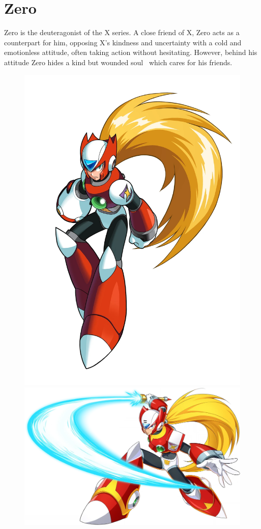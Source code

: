 \chapter{Zero}\label{char:Zero}
Zero is the deuteragonist of the X series. A close friend of X, Zero acts as a counterpart for him, opposing X's kindness and uncertainty with a cold and emotionless attitude, often taking action without hesitating. However, behind his attitude Zero hides a kind but wounded soul~\cite{wiki:Zero} which cares for his friends.

\begin{figure}[htp]
	\centering
	\includegraphics[height=\BIGportraitsize]{figures/Characters/Char_Z_2.png}	
	\includegraphics[height=\portraitsize]{figures/Characters/Char_Z.png}

\end{figure}
